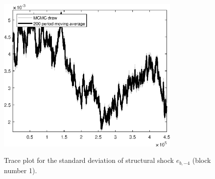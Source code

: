 \begin{figure}[H]
\centering
  \includegraphics[width=0.8\textwidth]{BRS_sectoral_wo_demand_shocks/graphs/TracePlot_SE_e_b_news_blck_1}\\
    \caption{Trace plot for the standard deviation of structural shock ${e_{b,-4}}$ (block number 1).}
\end{figure}
